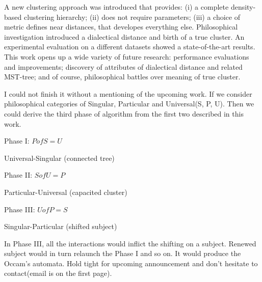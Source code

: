 \documentclass[12pt, a4paper, twocolumn]{article}
\begin{document}
A new clustering approach was introduced that provides: (i) a complete density-based clustering hierarchy; (ii) does not require parameters; (iii) a choice of metric defines near distances, that developes everything else. Philosophical investigation introduced a dialectical distance and birth of a true cluster. An experimental evaluation on a different datasets showed a state-of-the-art results. This work opens up a wide variety of future research: performance evaluations and improvements; discovery of attributes of dialectical distance and related MST-tree; and of course, philosophical battles over meaning of true cluster.

I could not finish it without a mentioning of the upcoming work. If we consider philosophical categories of Singular, Particular and Universal(S, P, U). Then we could derive the third phase of algorithm from the first two described in this work.  

\centerline{Phase I: $P of S = U$}
\centerline{Universal-Singular (connected tree)}
\vspace{\myvspace}
\centerline{Phase II: $S of U = P$}
\centerline{Particular-Universal (capacited cluster)}
\vspace{\myvspace}
\centerline{Phase III: $U of P = S$}
\centerline{Singular-Particular (shifted subject)}

In Phase III, all the interactions would inflict the shifting on a subject. Renewed subject would in turn relaunch the Phase I and so on. It would produce the Occam's automata. Hold tight for upcoming announcement and don't hesitate to contact(email is on the first page).


\printbibliography

\onecolumn

\end{document}
